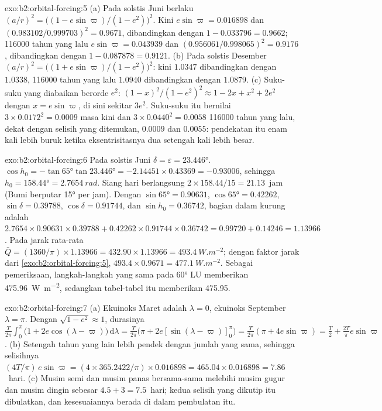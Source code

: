 \begin{solution}{exo:b2:orbital-forcing:5}
(a) Pada solstis Juni berlaku $(a/r)^2 = \bigl((1 - e\sin\varpi)/(1 - e^2)\bigr)^2$. Kini $e\sin\varpi
= 0.016898$ dan $(0.983102/0.999703)^2 = 0.9671$, dibandingkan dengan $1 - 0.033796 = 0.9662$;
\num{116000} tahun yang lalu $e\sin\varpi = 0.043939$ dan $(0.956061/0.998065)^2 = 0.9176$, dibandingkan dengan $1 -
0.087878 = 0.9121$. (b) Pada solstis Desember $(a/r)^2 = \bigl((1 + e\sin\varpi)/(1 -
e^2)\bigr)^2$: kini $1.0347$ dibandingkan dengan $1.0338$, \num{116000} tahun yang lalu $1.0940$ dibandingkan dengan $1.0879$.
(c) Suku-suku yang diabaikan berorde $e^2$: $(1 - x)^2/(1 - e^2)^2 \approx 1 - 2x + x^2 + 2e^2$
dengan $x = e\sin\varpi$, di sini sekitar $3e^2$. Suku-suku itu bernilai $3 \times 0.0172^2 = 0.0009$ masa kini dan $3
\times 0.0440^2 = 0.0058$ \num{116000} tahun yang lalu, dekat dengan selisih yang ditemukan, $0.0009$ dan
$0.0055$: pendekatan itu enam kali lebih buruk ketika eksentrisitasnya dua setengah kali
lebih besar.
\end{solution}

\begin{solution}{exo:b2:orbital-forcing:6}
Pada solstis Juni $\delta = \varepsilon = \ang{23.446}$. $\cos h_0 = -\tan\ang{65}\tan\ang{23.446}
= -2.14451 \times 0.43369 = -0.93006$, sehingga $h_0 = \ang{158.44} = \qty{2.7654}{rad}$. Siang hari berlangsung
$2 \times 158.44/15 = 21.13$~jam (Bumi berputar \ang{15} per jam). Dengan $\sin\ang{65} = 0.90631$,
$\cos\ang{65} = 0.42262$, $\sin\delta = 0.39788$, $\cos\delta = 0.91744$, dan $\sin h_0 = 0.36742$,
bagian dalam kurung adalah $2.7654 \times 0.90631 \times 0.39788 + 0.42262 \times 0.91744 \times 0.36742 = 0.99720
+ 0.14246 = 1.13966$. Pada jarak rata-rata $\bar Q = (1360/\pi) \times 1.13966 = 432.90 \times 1.13966
= \qty{493.4}{W.m^{-2}}$; dengan faktor jarak dari \cref{exo:b2:orbital-forcing:5}, $493.4 \times
0.9671 = \qty{477.1}{W.m^{-2}}$. Sebagai pemeriksaan, langkah-langkah yang sama pada \ang{60} LU memberikan \qty{475.96}{W.m^{-2}}, sedangkan tabel-tabel itu memberikan \num{475.95}.
\end{solution}

\begin{solution}{exo:b2:orbital-forcing:7}
(a) Ekuinoks Maret adalah $\lambda = 0$, ekuinoks September $\lambda = \pi$. Dengan $\sqrt{1 - e^2}
\approx 1$, durasinya $\frac{T}{2\pi}\int_0^{\pi}\bigl(1 + 2e\cos(\lambda -
\varpi)\bigr)\,\mathrm d\lambda = \frac{T}{2\pi}\bigl(\pi + 2e[\sin(\lambda - \varpi)]_0^{\pi}\bigr)
= \frac{T}{2\pi}(\pi + 4e\sin\varpi) = \frac T2 + \frac{2T}{\pi}e\sin\varpi$. (b) Setengah tahun yang lain
lebih pendek dengan jumlah yang sama, sehingga selisihnya $(4T/\pi)\,e\sin\varpi = (4 \times
365.2422/\pi) \times 0.016898 = 465.04 \times 0.016898 = 7.86$~hari. (c) Musim semi dan musim panas bersama-sama
melebihi musim gugur dan musim dingin sebesar $4.5 + 3 = 7.5$~hari; kedua selisih yang dikutip itu dibulatkan, dan
kesesuaiannya berada di dalam pembulatan itu.
\end{solution}

